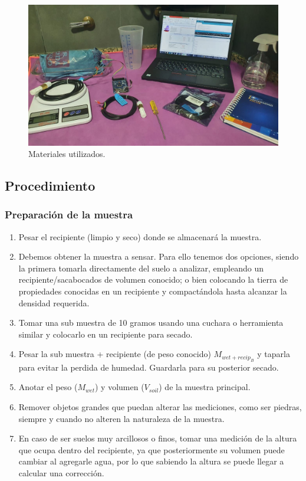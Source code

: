 \begin{figure}[H]
    \centering
    \includegraphics[width=\textwidth]{imagenes/imagenes calibracion/materiales.jpg}
    \caption{Materiales utilizados.}
    \label{fig:materiales}
\end{figure}

\subsection{Procedimiento}

\subsubsection{Preparación de la muestra}

\begin{enumerate}

    \item Pesar el recipiente (limpio y seco) donde se almacenará la muestra.
    \item Debemos obtener la muestra a sensar. Para ello tenemos dos opciones, siendo la primera tomarla directamente del suelo a analizar, empleando un recipiente/sacabocados de volumen conocido; o bien colocando la tierra de propiedades conocidas en un recipiente y compactándola hasta alcanzar la densidad requerida.
    \item Tomar una sub muestra de 10 gramos usando una cuchara o herramienta similar y colocarlo en un recipiente para secado.
    \item Pesar la sub muestra + recipiente (de peso conocido) $M_{wet+recip_B}$ y taparla para evitar la perdida de humedad. Guardarla para su posterior secado.
    \item Anotar el peso ($M_{wet}$) y volumen ($V_{soil}$) de la muestra principal.
    \item Remover objetos grandes que puedan alterar las mediciones, como ser piedras, siempre y cuando no alteren la naturaleza de la muestra.
    \item En caso de ser suelos muy arcillosos o finos, tomar una medición de la altura que ocupa dentro del recipiente, ya que posteriormente su volumen puede cambiar al agregarle agua, por lo que sabiendo la altura se puede llegar a calcular una corrección.
    
\end{enumerate}

